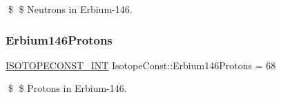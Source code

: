 \$ \$ Neutrons in Erbium-\/146. \mbox{\label{group___isotope_const-_erbium-_er146_gaa96b5ee1a061f07e64ebda43e6a87ef5}} 
\subsubsection{\texorpdfstring{Erbium146\+Protons}{Erbium146Protons}}
{\footnotesize\ttfamily \mbox{\hyperlink{group___isotope_const-_macros_ga5f18360b3e99483a35c32d789e62621c}{I\+S\+O\+T\+O\+P\+E\+C\+O\+N\+S\+T\+\_\+\+I\+NT}} Isotope\+Const\+::\+Erbium146\+Protons = 68}

\$ \$ Protons in Erbium-\/146. 
